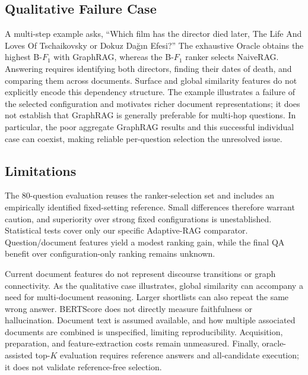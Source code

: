 \subsection{Qualitative Failure Case} \label{sec5.7}
A multi-step example asks, ``Which film has the director died later, The Life And Loves Of Tschaikovsky or Dokuz Dağın Efesi?'' The exhaustive Oracle obtains the highest B-$F_1$ with GraphRAG, whereas the B-$F_1$ ranker selects NaiveRAG. Answering requires identifying both directors, finding their dates of death, and comparing them across documents. Surface and global similarity features do not explicitly encode this dependency structure. The example illustrates a failure of the selected configuration and motivates richer document representations; it does not establish that GraphRAG is generally preferable for multi-hop questions. In particular, the poor aggregate GraphRAG results and this successful individual case can coexist, making reliable per-question selection the unresolved issue.

\subsection{Limitations} \label{sec5.8}
The 80-question evaluation reuses the ranker-selection set and includes an empirically identified fixed-setting reference. Small differences therefore warrant caution, and superiority over strong fixed configurations is unestablished. Statistical tests cover only our specific Adaptive-RAG comparator. Question/document features yield a modest ranking gain, while the final QA benefit over configuration-only ranking remains unknown.

Current document features do not represent discourse transitions or graph connectivity. As the qualitative case illustrates, global similarity can accompany a need for multi-document reasoning. Larger shortlists can also repeat the same wrong answer. BERTScore does not directly measure faithfulness or hallucination. Document text is assumed available, and how multiple associated documents are combined is unspecified, limiting reproducibility. Acquisition, preparation, and feature-extraction costs remain unmeasured. Finally, oracle-assisted top-$K$ evaluation requires reference answers and all-candidate execution; it does not validate reference-free selection.
